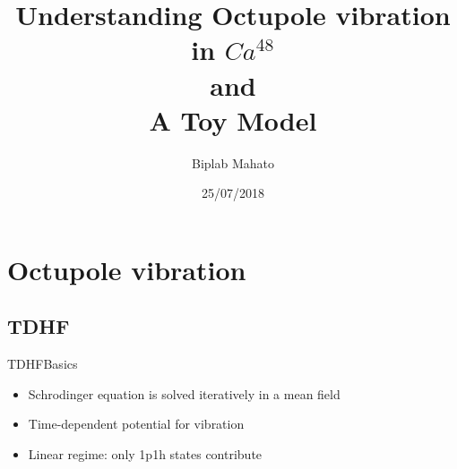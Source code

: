 \documentclass[pdf]{beamer}
\title{Understanding Octupole vibration in $Ca^{48}$ \\ and \\A Toy Model}
\author{Biplab Mahato}
\institute{Visiting student from IISc}
\date{25/07/2018}
\begin{document}
        \frame{\titlepage}
        \section{Octupole vibration}
        \subsection{TDHF}
            \begin{frame}{TDHF}{Basics}
                \begin{itemize}
                    \item<2->Schrodinger equation is solved iteratively in a mean field
                    \item<3->Time-dependent potential for vibration
                    \item<4->Linear regime: only 1p1h states contribute
                \end{itemize}
            \end{frame}
\end{document}

